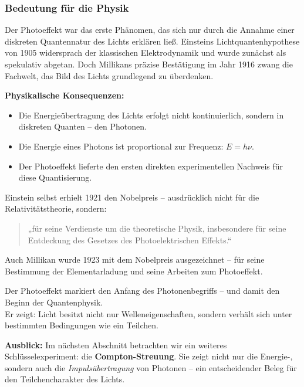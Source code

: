 \subsubsection{Bedeutung für die Physik}

Der Photoeffekt war das erste Phänomen, das sich nur durch die Annahme einer diskreten Quantennatur des Lichts erklären ließ. Einsteins Lichtquantenhypothese von 1905 widersprach der klassischen Elektrodynamik und wurde zunächst als spekulativ abgetan. Doch Millikans präzise Bestätigung im Jahr 1916 zwang die Fachwelt, das Bild des Lichts grundlegend zu überdenken.

\textbf{Physikalische Konsequenzen:}
\begin{itemize}
	\item Die Energieübertragung des Lichts erfolgt nicht kontinuierlich, sondern in diskreten Quanten – den Photonen.
	\item Die Energie eines Photons ist proportional zur Frequenz: \( E = h\nu \).
	\item Der Photoeffekt lieferte den ersten direkten experimentellen Nachweis für diese Quantisierung.
\end{itemize}

Einstein selbst erhielt 1921 den Nobelpreis – ausdrücklich nicht für die Relativitätstheorie, sondern:
\begin{quote}
	„für seine Verdienste um die theoretische Physik, insbesondere für seine Entdeckung des Gesetzes des Photoelektrischen Effekts.“
\end{quote}

Auch Millikan wurde 1923 mit dem Nobelpreis ausgezeichnet – für seine Bestimmung der Elementarladung und seine Arbeiten zum Photoeffekt.

\vspace{1em}
\begin{tcolorbox}[hinweisbox, title=Fazit]
	\label{box:fazit der photo}
	\small
	Der Photoeffekt markiert den Anfang des Photonenbegriffs – und damit den Beginn der Quantenphysik.\\
	Er zeigt: Licht besitzt nicht nur Welleneigenschaften, sondern verhält sich unter bestimmten Bedingungen wie ein Teilchen.
\end{tcolorbox}
\vspace{1em}
\textbf{Ausblick:}  
Im nächsten Abschnitt betrachten wir ein weiteres Schlüsselexperiment: die \textbf{Compton-Streuung}. Sie zeigt nicht nur die Energie-, sondern auch die \emph{Impulsübertragung} von Photonen – ein entscheidender Beleg für den Teilchencharakter des Lichts.

